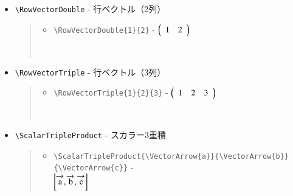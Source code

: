 \documentclass[oneside,10pt,a4paper]{jsarticle}
\begin{document}
\begin{itemize}
\begin{quote}
        \,
      \end{quote}
    \item \verb|\RowVectorDouble| - 行ベクトル（2列）
      \begin{quote}
        \Example
        \begin{itemize}
          \item \verb|\RowVectorDouble{1}{2}| - $\left( \begin{array}{cc} 1 & 2 \end{array} \right)$
        \end{itemize}
        \,
      \end{quote}
    \item \verb|\RowVectorTriple| - 行ベクトル（3列）
      \begin{quote}
        \Example
        \begin{itemize}
          \item \verb|\RowVectorTriple{1}{2}{3}| - $\left( \begin{array}{ccc} 1 & 2 & 3 \end{array} \right)$
        \end{itemize}
        \,
      \end{quote}
    \item \verb|\ScalarTripleProduct| - スカラー3重積
      \begin{quote}
        \Example
        \begin{itemize}
          \item \verb|\ScalarTripleProduct{\VectorArrow{a}}{\VectorArrow{b}}{\VectorArrow{c}}| - \\ $\left[ \overrightarrow{\mathstrut \mathrm{a}}, \overrightarrow{\mathstrut \mathrm{b}}, \overrightarrow{\mathstrut \mathrm{c}} \right]$
        \end{itemize}
      \end{quote}
  \end{itemize}
\end{document}
